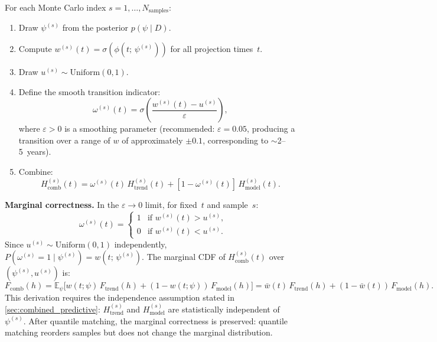 \documentclass[11pt]{article}
\begin{document}
For each Monte Carlo index $s = 1, \ldots, N_{\mathrm{samples}}$:
\begin{enumerate}
  \item Draw $\psi^{(s)}$ from the posterior $p(\psi \mid D)$.
  \item Compute $w^{(s)}(t) = \sigma(\phi(t;\,\psi^{(s)}))$ for all projection times~$t$.
  \item Draw $u^{(s)} \sim \mathrm{Uniform}(0, 1)$.
  \item Define the smooth transition indicator:
  \begin{equation}
    \omega^{(s)}(t) = \sigma\!\left(\frac{w^{(s)}(t) - u^{(s)}}{\varepsilon}\right),
    \label{eq:smooth_transition}
  \end{equation}
  where $\varepsilon > 0$ is a smoothing parameter (recommended: $\varepsilon = 0.05$, producing a transition over a range of $w$ of approximately $\pm 0.1$, corresponding to $\sim$2--5~years).
  \item Combine:
  \begin{equation}
    H_{\mathrm{comb}}^{(s)}(t) = \omega^{(s)}(t)\,H_{\mathrm{trend}}^{(s)}(t) + [1 - \omega^{(s)}(t)]\,H_{\mathrm{model}}^{(s)}(t).
    \label{eq:trajectory_combination}
  \end{equation}
\end{enumerate}

\textbf{Marginal correctness.}  In the $\varepsilon \to 0$ limit, for fixed~$t$ and sample~$s$:
\[
  \omega^{(s)}(t) = \begin{cases} 1 & \text{if } w^{(s)}(t) > u^{(s)}, \\ 0 & \text{if } w^{(s)}(t) < u^{(s)}. \end{cases}
\]
Since $u^{(s)} \sim \mathrm{Uniform}(0,1)$ independently, $P(\omega^{(s)} = 1 \mid \psi^{(s)}) = w(t;\,\psi^{(s)})$.  The marginal CDF of $H_{\mathrm{comb}}^{(s)}(t)$ over $(\psi^{(s)}, u^{(s)})$ is:
\[
  F_{\mathrm{comb}}(h) = \mathbb{E}_\psi\!\big[w(t;\psi)\,F_{\mathrm{trend}}(h) + (1-w(t;\psi))\,F_{\mathrm{model}}(h)\big] = \bar{w}(t)\,F_{\mathrm{trend}}(h) + (1-\bar{w}(t))\,F_{\mathrm{model}}(h).
\]
This derivation requires the independence assumption stated in \cref{sec:combined_predictive}: $H_{\mathrm{trend}}^{(s)}$ and $H_{\mathrm{model}}^{(s)}$ are statistically independent of~$\psi^{(s)}$.  After quantile matching, the marginal correctness is preserved: quantile matching reorders samples but does not change the marginal distribution.
\end{document}
